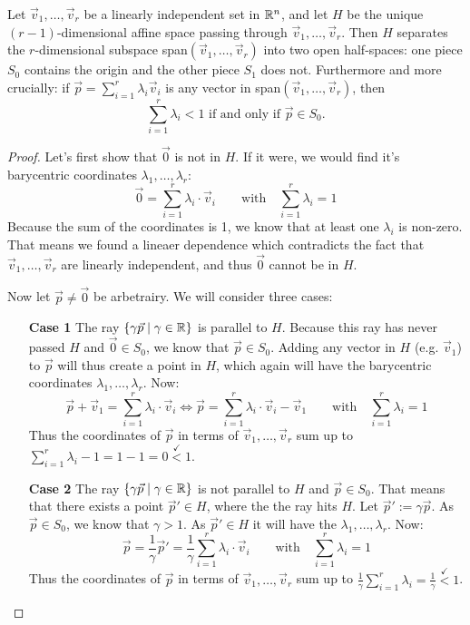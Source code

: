 \begin{lemma}
    \label{lemma:affine_space}
    Let $\vec v_1,\dots,\vec v_r$ be a linearly independent set in $\mathbb{R}^n$, and let $H$ be the unique $(r-1)$-dimensional affine space passing through $\vec v_1,\dots,\vec v_r$. Then $H$ separates the $r$-dimensional subspace span$(\vec v_1,\dots,\vec v_r)$ into two open half-spaces: one piece $S_0$ contains the origin and the other piece $S_1$ does not. Furthermore and more crucially: if $\vec p = \sum_{i=1}^r \lambda_i \vec v_i$ is any vector in span$(\vec v_1,\dots,\vec v_r)$, then
    $$
    \sum_{i=1}^r \lambda_i < 1 \text{ if and only if } \vec p \in S_0.
    $$
\end{lemma}
\begin{proof}
    Let's first show that $\vec 0$ is not in $H$. If it were, we would find it's barycentric coordinates $\lambda_1, \dots, \lambda_r$:
    $$\vec 0 = \sum_{i=1}^r \lambda_i \cdot \vec v_i \qquad\mathrm{with}\quad\sum_{i=1}^{r}\lambda_i = 1$$
    Because the sum of the coordinates is 1, we know that at least one $\lambda_i$ is non-zero. That means we found a lineaer dependence which contradicts the fact that $\vec v_1,\dots,\vec v_r$ are linearly independent, and thus $\vec 0$ cannot be in $H$.

    Now let $\vec p \neq \vec 0$ be arbetrairy. We will consider three cases:
    \begin{itemize}
        \item[\textbf{Case 1}] The ray $\{\gamma\vec p\mid \gamma \in \mathbb{R}\}$ is parallel to $H$. Because this ray has never passed $H$ and $\vec 0 \in S_0$, we know that $\vec p \in S_0$. Adding any vector in $H$ (e.g. $\vec v_1$) to $\vec p$ will thus create a point in $H$, which again will have the barycentric coordinates $\lambda_1, \dots, \lambda_r$. Now:
        $$\vec p + \vec v_1 = \sum_{i=1}^{r}\lambda_i\cdot \vec v_i \Leftrightarrow \vec p = \sum_{i=1}^{r}\lambda_i\cdot \vec v_i - \vec v_1\qquad\mathrm{with}\quad\sum_{i=1}^{r}\lambda_i = 1$$
        Thus the coordinates of $\vec p$ in terms of $\vec v_1, \dots, \vec v_r$ sum up to $\sum_{i=1}^{r}\lambda_i - 1 = 1 - 1 = 0 \stackrel{\checkmark}{<} 1$.

        \item[\textbf{Case 2}] The ray $\{\gamma\vec p\mid \gamma \in \mathbb{R}\}$ is not parallel to $H$ and $\vec p \in S_0$. That means that there exists a point $\vec p' \in H$, where the the ray hits $H$. Let $\vec p' := \gamma \vec p$. As $\vec p \in S_0$, we know that $\gamma > 1$. As $\vec p' \in H$ it will have the $\lambda_1, \dots, \lambda_r$. Now:
        $$\vec p = \frac{1}{\gamma}\vec p' = \frac{1}{\gamma} \sum_{i=1}^{r}\lambda_i\cdot \vec v_i \qquad\mathrm{with}\quad\sum_{i=1}^{r}\lambda_i = 1$$
        Thus the coordinates of $\vec p$ in terms of $\vec v_1, \dots, \vec v_r$ sum up to $\frac{1}{\gamma}\sum_{i=1}^{r}\lambda_i = \frac{1}{\gamma}\stackrel{\checkmark}{<} 1$.


\end{itemize}
\end{proof}

